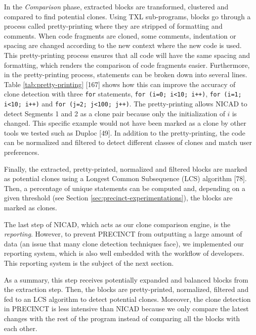 \documentclass[12pt]{report}
\begin{document}
In the \emph{Comparison} phase, extracted blocks are transformed,
clustered and compared to find potential clones. Using TXL sub-programs,
blocks go through a process called pretty-printing where they are
stripped of formatting and comments. When code fragments are cloned,
some comments, indentation or spacing are changed according to the new
context where the new code is used. This pretty-printing process ensures
that all code will have the same spacing and formatting, which renders
the comparison of code fragments easier. Furthermore, in the
pretty-printing process, statements can be broken down into several
lines. Table \ref{tab:pretty-printing} {[}167{]} shows how this can
improve the accuracy of clone detection with three \lstinline!for!
statements, \lstinline!for (i=0; i<10; i++)!,
\lstinline!for (i=1; i<10; i++)! and \lstinline!for (j=2; j<100; j++)!.
The pretty-printing allows NICAD to detect Segments 1 and 2 as a clone
pair because only the initialization of \(i\) is changed. This specific
example would not have been marked as a clone by other tools we tested
such as Duploc {[}49{]}. In addition to the pretty-printing, the code
can be normalized and filtered to detect different classes of clones and
match user preferences.



Finally, the extracted, pretty-printed, normalized and filtered blocks
are marked as potential clones using a Longest Common Subsequence (LCS)
algorithm {[}78{]}. Then, a percentage of unique statements can be
computed and, depending on a given threshold (see Section
\ref{sec:precinct-experimentations}), the blocks are marked as clones.

The last step of NICAD, which acts as our clone comparison engine, is
the \emph{reporting}. However, to prevent PRECINCT from outputting a
large amount of data (an issue that many clone detection techniques
face), we implemented our reporting system, which is also well embedded
with the workflow of developers. This reporting system is the subject of
the next section.

As a summary, this step receives potentially expanded and balanced
blocks from the extraction step. Then, the blocks are pretty-printed,
normalized, filtered and fed to an LCS algorithm to detect potential
clones. Moreover, the clone detection in PRECINCT is less intensive than
NICAD because we only compare the latest changes with the rest of the
program instead of comparing all the blocks with each other.
\end{document}
